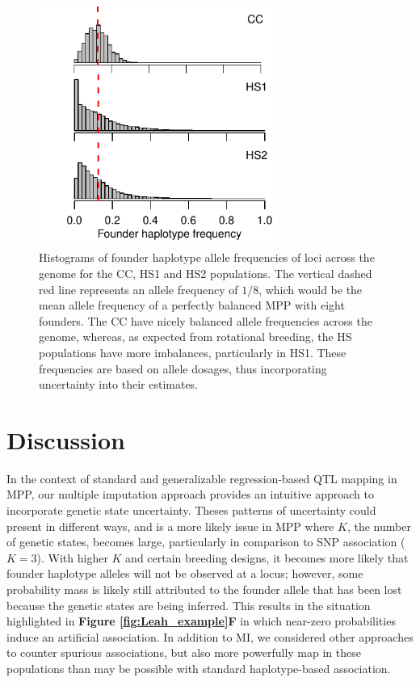 \begin{figure}
\renewcommand{\familydefault}{\sfdefault}\normalfont
\centering
\includegraphics[width=0.7\textwidth, clip, trim={0.3in 0 0 0.1in}]{figures/4-mi/population_allele_freq.pdf}
\caption[Founder haplotype allele frequencies in experimental populations]{Histograms of founder haplotype allele frequencies of loci across the genome for the CC, HS1 and HS2 populations. The vertical dashed red line represents an allele frequency of $1/8$, which would be the mean allele frequency of a perfectly balanced MPP with eight founders. The CC have nicely balanced allele frequencies across the genome, whereas, as expected from rotational breeding, the HS populations have more imbalances, particularly in HS1. These frequencies are based on allele dosages, thus incorporating uncertainty into their estimates.\label{fig:population_freq}}
\end{figure}

\section{Discussion}

In the context of standard and generalizable regression-based QTL mapping in MPP, our multiple imputation approach provides an intuitive approach to incorporate genetic state uncertainty. Theses patterns of uncertainty could present in different ways, and is a more likely issue in MPP where $K$, the number of genetic states, becomes large, particularly in comparison to SNP association ($K=3$). With higher $K$ and certain breeding designs, it becomes more likely that founder haplotype alleles will not be observed at a locus; however, some probability mass is likely still attributed to the founder allele that has been lost because the genetic states are being inferred. This results in the situation highlighted in \textbf{Figure \ref{fig:Leah_example}F} in which near-zero probabilities induce an artificial association. In addition to MI, we considered other approaches to counter spurious associations, but also more powerfully map in these populations than may be possible with standard haplotype-based association.

